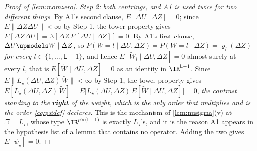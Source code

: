 \begin{proof}[Proof of \cref{lem:momzero}]
\emph{Step 2: both centrings, and A1 is used twice for two different things.} By A1's second clause,
$E[\Delta U\mid\Delta Z]=0$; since $E\|\Delta Z\Delta U\|<\infty$ by Step 1, the tower property gives
$E[\Delta Z\Delta U]=E[\Delta Z\,E[\Delta U\mid\Delta Z]]=0$. By A1's first clause,
$\Delta U\upmodels W\mid\Delta Z$, so
$P(W=l\mid\Delta U,\Delta Z)=P(W=l\mid\Delta Z)=\varrho_l(\Delta Z)$ \emph{for every
$l\in\{1,\dots,\mathsf L-1\}$}, and
hence $E[\widetilde W_l\mid\Delta U,\Delta Z]=0$ almost surely at every $l$, that is
$E[\widetilde W\mid\Delta U,\Delta Z]=0$ as an identity in $\IR^{\mathsf L-1}$. Since
$E\|L_\star(\Delta U,\Delta Z)\,\widetilde W\|<\infty$ by Step 1, the tower property gives
$E[L_\star(\Delta U,\Delta Z)\,\widetilde W]=E\big[L_\star(\Delta U,\Delta Z)\,E[\widetilde W\mid\Delta U,\Delta Z]\big]=0$,
\emph{the contrast standing to the \textbf{right} of the weight, which is the only order that
multiplies and is the order \eqref{eq:psidef} declares}.
This is the mechanism of \cref{lem:nusigma}\textup{(v)} at $\Xi=L_\star$, whose type
$\IR^{p\times(\mathsf L-1)}$ is exactly $L_\star$'s, and it is the reason A1
appears in the hypothesis list of a lemma that contains no operator. Adding the two gives
$E[\psi_\star]=0$.


\end{proof}
